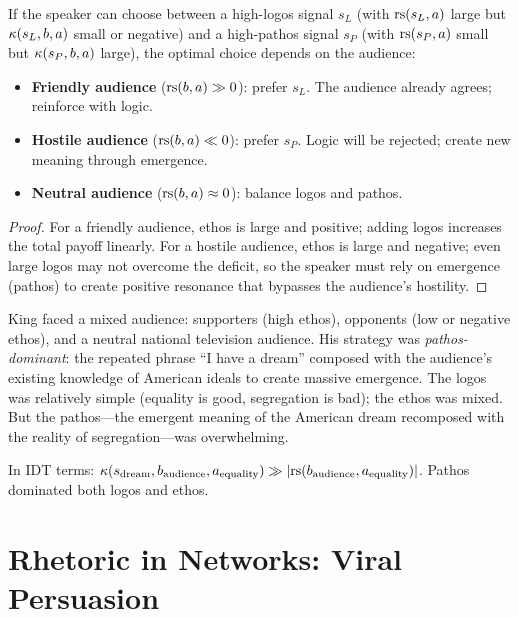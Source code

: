 \begin{theorem}
\label{thm:ethos-pathos-tradeoff}
If the speaker can choose between a high-logos signal $s_L$ (with
$\mathrm{rs}(s_L, a)$ large but $\kappa(s_L, b, a)$ small or negative) and a
high-pathos signal $s_P$ (with $\mathrm{rs}(s_P, a)$ small but $\kappa(s_P, b, a)$
large), the optimal choice depends on the audience:
\begin{itemize}
  \item \textbf{Friendly audience} ($\mathrm{rs}(b, a) \gg 0$): prefer $s_L$.
        The audience already agrees; reinforce with logic.
  \item \textbf{Hostile audience} ($\mathrm{rs}(b, a) \ll 0$): prefer $s_P$.
        Logic will be rejected; create new meaning through emergence.
  \item \textbf{Neutral audience} ($\mathrm{rs}(b, a) \approx 0$): balance logos
        and pathos.
\end{itemize}
\end{theorem}

\begin{proof}
For a friendly audience, ethos is large and positive; adding logos increases
the total payoff linearly.  For a hostile audience, ethos is large and
negative; even large logos may not overcome the deficit, so the speaker must
rely on emergence (pathos) to create positive resonance that bypasses the
audience's hostility.
\end{proof}

\begin{example}
\label{ex:mlk}
King faced a mixed audience: supporters (high ethos), opponents (low or
negative ethos), and a neutral national television audience.  His strategy
was \emph{pathos-dominant}: the repeated phrase ``I have a dream'' composed
with the audience's existing knowledge of American ideals to create massive
emergence.  The logos was relatively simple (equality is good, segregation is
bad); the ethos was mixed.  But the pathos---the emergent meaning of the
American dream recomposed with the reality of segregation---was overwhelming.

In IDT terms: $\kappa(s_{\text{dream}}, b_{\text{audience}}, a_{\text{equality}})
\gg |\mathrm{rs}(b_{\text{audience}}, a_{\text{equality}})|$.  Pathos dominated both
logos and ethos.
\end{example}


\section{Rhetoric in Networks: Viral Persuasion}

